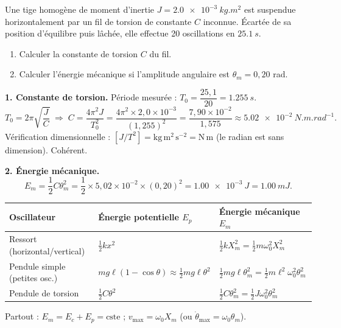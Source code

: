 \documentclass[11pt]{article}
\begin{document}
\begin{exoresolu}
Une tige homogène de moment d'inertie $J = \SI{2,0e-3}{kg.m^2}$ est suspendue horizontalement par un fil de torsion de constante $C$ inconnue. Écartée de sa position d'équilibre puis lâchée, elle effectue 20 oscillations en $\SI{25,1}{s}$.
\begin{enumerate}
\item Calculer la constante de torsion $C$ du fil.
\item Calculer l'énergie mécanique si l'amplitude angulaire est $\theta_m = 0{,}20$ rad.
\end{enumerate}
\tcblower
\textbf{1. Constante de torsion.}
Période mesurée : $T_0 = \dfrac{25{,}1}{20} = \SI{1,255}{s}$.
\[ T_0 = 2\pi\sqrt{\frac{J}{C}} \;\Rightarrow\; C = \frac{4\pi^2 J}{T_0^2} = \frac{4\pi^2\times 2{,}0\times 10^{-3}}{(1{,}255)^2} = \frac{7{,}90\times 10^{-2}}{1{,}575} \approx \SI{5,02e-2}{N.m.rad^{-1}}. \]
Vérification dimensionnelle : $[J/T^2] = \mathrm{kg\,m^2\,s^{-2}} = \mathrm{N\,m}$ (le radian est sans dimension). Cohérent.

\textbf{2. Énergie mécanique.}
\[ E_m = \frac{1}{2}C\theta_m^2 = \frac{1}{2}\times 5{,}02\times 10^{-2}\times (0{,}20)^2 = \SI{1,00e-3}{J} = \SI{1,00}{mJ}. \]
\end{exoresolu}

\begin{aretenir}
\begin{center}
\begin{tabularx}{\linewidth}{|l|X|X|}\hline
\textbf{Oscillateur} & \textbf{Énergie potentielle $E_p$} & \textbf{Énergie mécanique $E_m$} \\ \hline
Ressort (horizontal/vertical) & $\frac{1}{2}k x^2$ & $\frac{1}{2}k X_m^2 = \frac{1}{2}m\omega_0^2 X_m^2$ \\ \hline
Pendule simple (petites osc.) & $mg\ell(1-\cos\theta) \approx \frac{1}{2}mg\ell\theta^2$ & $\frac{1}{2}mg\ell\theta_m^2 = \frac{1}{2}m\ell^2\omega_0^2\theta_m^2$ \\ \hline
Pendule de torsion & $\frac{1}{2}C\theta^2$ & $\frac{1}{2}C\theta_m^2 = \frac{1}{2}J\omega_0^2\theta_m^2$ \\ \hline
\end{tabularx}
\end{center}
Partout : $E_m = E_c + E_p = \text{cste}$ ; $v_{\max} = \omega_0 X_m$ (ou $\dot{\theta}_{\max} = \omega_0\theta_m$).
\end{aretenir}
\end{document}
